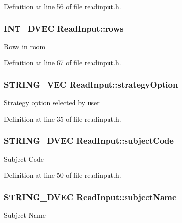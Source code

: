 \-Definition at line 56 of file readinput.\-h.

\hypertarget{classReadInput_ac853c80a2fad7a58fecde30db9fc93df}{
\subsubsection[{rows}]{\setlength{\rightskip}{0pt plus 5cm}\-I\-N\-T\-\_\-D\-V\-E\-C {\bf \-Read\-Input\-::rows}}}\label{de/d50/classReadInput_ac853c80a2fad7a58fecde30db9fc93df}
\-Rows in room 

\-Definition at line 67 of file readinput.\-h.

\hypertarget{classReadInput_a0f62d76d15b123767751a22f87dc79ed}{
\subsubsection[{strategy\-Option}]{\setlength{\rightskip}{0pt plus 5cm}\-S\-T\-R\-I\-N\-G\-\_\-\-V\-E\-C {\bf \-Read\-Input\-::strategy\-Option}}}\label{de/d50/classReadInput_a0f62d76d15b123767751a22f87dc79ed}
\hyperlink{classStrategy}{\-Strategy} option selected by user 

\-Definition at line 35 of file readinput.\-h.

\hypertarget{classReadInput_a5db96d61a79c6a36bcdc4907bebf8bd0}{
\subsubsection[{subject\-Code}]{\setlength{\rightskip}{0pt plus 5cm}\-S\-T\-R\-I\-N\-G\-\_\-D\-V\-E\-C {\bf \-Read\-Input\-::subject\-Code}}}\label{de/d50/classReadInput_a5db96d61a79c6a36bcdc4907bebf8bd0}
\-Subject \-Code 

\-Definition at line 50 of file readinput.\-h.

\hypertarget{classReadInput_acbd2ac53fb64da88965fa5e542f2c456}{
\subsubsection[{subject\-Name}]{\setlength{\rightskip}{0pt plus 5cm}\-S\-T\-R\-I\-N\-G\-\_\-D\-V\-E\-C {\bf \-Read\-Input\-::subject\-Name}}}\label{de/d50/classReadInput_acbd2ac53fb64da88965fa5e542f2c456}
\-Subject \-Name 

